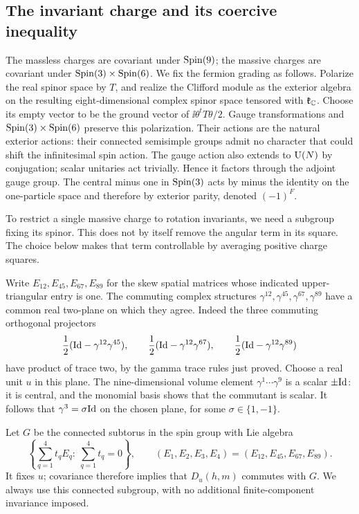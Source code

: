 \subsection{The invariant charge and its coercive inequality}

The massless charges are covariant under \(\operatorname{Spin}(9)\); the massive
charges are covariant under \(\operatorname{Spin}(3)\times\operatorname{Spin}(6)\). We fix the
fermion grading as follows. Polarize the real spinor space by \(T\),
and realize the Clifford module as the exterior algebra on the
resulting eight-dimensional complex spinor space tensored with
\(\mathfrak k_\mathbb C\). Choose its empty vector to be the ground vector
of \(\ii\theta^tT\theta/2\). Gauge transformations and
\(\operatorname{Spin}(3)\times\operatorname{Spin}(6)\) preserve this polarization. Their actions
are the natural exterior actions: their connected semisimple groups
admit no character that could shift the infinitesimal spin action.
The gauge action also extends to \(\operatorname{U}(N)\) by conjugation; scalar
unitaries act trivially. Hence it factors through the adjoint gauge
group. The central minus one in \(\operatorname{Spin}(3)\) acts by minus the
identity on the one-particle space and therefore by exterior parity,
denoted \((-1)^F\).

To restrict a single massive charge to rotation invariants, we need a
subgroup fixing its spinor. This does not by itself remove the angular
term in its square. The choice below makes that term controllable by
averaging positive charge squares.

Write \(E_{12},E_{45},E_{67},E_{89}\) for the skew spatial matrices
whose indicated upper-triangular entry is one. The commuting complex
structures
\(\gamma^{12},\gamma^{45},\gamma^{67},\gamma^{89}\) have a common
real two-plane on which they agree. Indeed the three commuting
orthogonal projectors
\[
 \frac12(\mathrm{Id}-\gamma^{12}\gamma^{45}),\qquad
 \frac12(\mathrm{Id}-\gamma^{12}\gamma^{67}),\qquad
 \frac12(\mathrm{Id}-\gamma^{12}\gamma^{89})
\]
have product of trace two, by the gamma trace rules just proved.
Choose a real unit \(u\) in this plane. The nine-dimensional volume
element \(\gamma^1\cdots\gamma^9\) is a scalar \(\pm\mathrm{Id}\): it is
central, and the monomial basis shows that the commutant is scalar.
It follows that \(\gamma^3=\sigma\mathrm{Id}\) on the chosen plane, for
some \(\sigma\in\{1,-1\}\).

Let \(G\) be the connected subtorus in the spin group with Lie
algebra
\begin{equation}
\label{alg:fixing-torus}
 \left\{\sum_{q=1}^4t_qE_q:\ \sum_{q=1}^4t_q=0\right\},
 \qquad (E_1,E_2,E_3,E_4)=(E_{12},E_{45},E_{67},E_{89}).
\end{equation}
It fixes \(u\); covariance therefore implies that \(D_u(h,m)\)
commutes with \(G\). We always use this connected subgroup, with no
additional finite-component invariance imposed.

